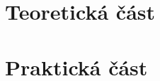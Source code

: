 \documentclass[a4paper,12pt]{report}	%
\begin{document}
\chapter{Teoretická část}

\newpage

\newpage



\chapter{Praktická část}

\newpage




%


\nocite{*}				%





\end{document}
